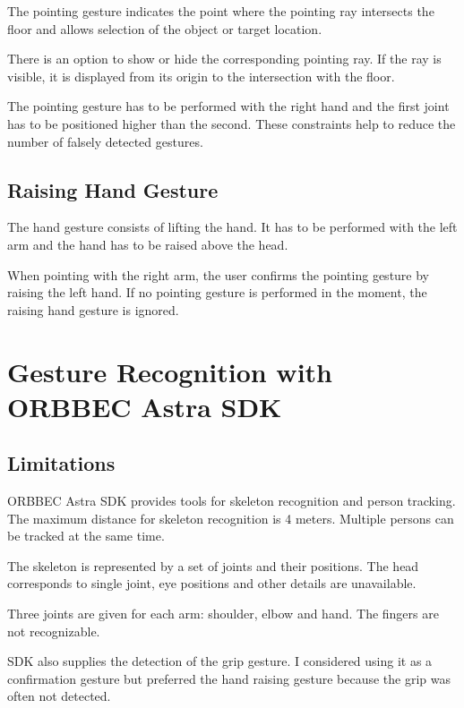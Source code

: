 The pointing gesture indicates the point where the pointing ray intersects the floor and allows selection of the object or target location.\par
There is an option to show or hide the corresponding pointing ray. If the ray is visible, it is displayed from its origin to the intersection with the floor.\par
The pointing gesture has to be performed with the right hand and the first joint has to be positioned higher than the second. These constraints help to reduce the number of falsely detected gestures.\par

\subsection{Raising Hand Gesture}
The hand gesture consists of lifting the hand. It has to be performed with the left arm and the hand  has to be raised above the head.\par
When pointing with the right arm, the user confirms the pointing gesture by raising the left hand. If no pointing gesture is performed in the moment, the raising hand gesture is ignored.\par

\section{Gesture Recognition with ORBBEC Astra SDK}

\subsection{Limitations}
ORBBEC Astra SDK provides tools for skeleton recognition and person tracking. The maximum distance for skeleton recognition is 4 meters. Multiple persons can be tracked at the same time.\par
The skeleton is represented by a set of joints and their positions. The head corresponds to single joint, eye positions and other details are unavailable.\par
Three joints are given for each arm: shoulder, elbow and hand. The fingers are not recognizable.\par
SDK also supplies the detection of the grip gesture. I considered using it as a confirmation gesture but preferred the hand raising gesture because the grip was often not detected.\par

